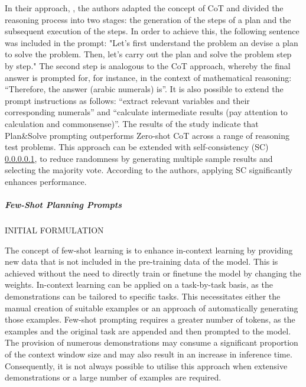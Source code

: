 \documentclass{article}
\begin{document}
In their approach, \cite{wang_plan-and-solve_2023}, the authors adapted the concept of CoT and divided the reasoning process into two stages: the generation of the steps of a plan and the subsequent execution of the steps. In order to achieve this, the following sentence was included in the prompt: "Let's first understand the problem an devise a plan to solve the problem. Then, let's carry out the plan and solve the problem step by step." The second step is analogous to the CoT approach, whereby the final answer is prompted for, for instance, in the context of mathematical reasoning: “Therefore, the answer (arabic numerals) is”.  It is also possible to extend the prompt instructions as follows: “extract relevant variables and their corresponding numerals” and “calculate intermediate results (pay attention to calculation and commonsense)”.  The results of the study indicate that Plan\&Solve prompting outperforms Zero-shot CoT across a range of reasoning test problems. This approach can be extended with self-consistency (SC) \ref{}, to reduce randomness by generating multiple sample results and selecting the majority vote. According to the authors, applying SC significantly enhances performance.



\subparagraph{Few-Shot Planning Prompts}
INITIAL FORMULATION

The concept of few-shot learning is to enhance in-context learning by providing new data that is not included in the pre-training data of the model. This is achieved without the need to directly train or finetune the model by changing the weights. In-context learning can be applied on a task-by-task basis, as the demonstrations can be tailored to specific tasks. This necessitates either the manual creation of suitable examples or an approach of automatically generating those examples. Few-shot prompting requires a greater number of tokens, as the examples and the original task are appended and then prompted to the model. The provision of numerous demonstrations may consume a significant proportion of the context window size and may also result in an increase in inference time. Consequently, it is not always possible to utilise this approach when extensive demonstrations or a large number of examples are required. 

\end{document}
